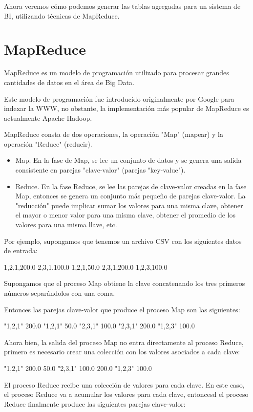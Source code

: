 Ahora veremos cómo podemos generar las tablas agregadas para un sistema de BI, utilizando técnicas de MapReduce.

\section{MapReduce}

MapReduce es un modelo de programación utilizado para procesar grandes cantidades de datos en el área de Big Data.

Este modelo de programación fue introducido originalmente por Google para indexar la WWW, no obstante, la implementación más popular de MapReduce es actualmente Apache Hadoop.

MapReduce consta de dos operaciones, la operación "Map" (mapear) y la operación "Reduce" (reducir).

\begin{itemize}
\item Map. En la fase de Map, se lee un conjunto de datos y se genera una salida consistente en parejas "clave-valor" (parejas "key-value").
\item Reduce. En la fase Reduce, se lee las parejas de clave-valor creadas en la fase Map, entonces se genera un conjunto más pequeño de parejas clave-valor. La "reducción" puede implicar sumar los valores para una misma clave, obtener el mayor o menor valor para una misma clave, obtener el promedio de los valores para una misma llave, etc.
\end{itemize}

Por ejemplo, supongamos que tenemos un archivo CSV con los siguientes datos de entrada:

1,2,1,200.0 2,3,1,100.0 1,2,1,50.0 2,3,1,200.0 1,2,3,100.0

Supongamos que el proceso Map obtiene la clave concatenando los tres primeros números separándolos con una coma.

Entonces las parejas clave-valor que produce el proceso Map son las siguientes:

"1,2,1"  200.0 "1,2,1"  50.0 "2,3,1"  100.0 "2,3,1"  200.0 "1,2,3"  100.0

Ahora bien, la salida del proceso Map no entra directamente al proceso Reduce, primero es necesario crear una colección con los valores asociados a cada clave:

"1,2,1"  200.0 50.0 "2,3,1"  100.0 200.0 "1,2,3"  100.0

El proceso Reduce recibe una colección de valores para cada clave. En este caso, el proceso Reduce va a acumular los valores para cada clave, entoncesd el proceso Reduce finalmente produce las siguientes parejas clave-valor:

